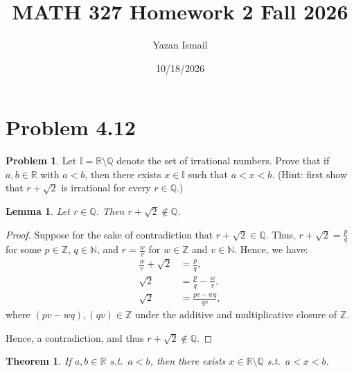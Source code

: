 \documentclass{article}
\title{MATH 327 Homework 2 Fall 2026}
\author{Yazan Ismail}
\date{10/18/2026}
\newtheorem{lemma}{Lemma}
\newtheorem{theorem}{Theorem}
\theoremstyle{definition}
\newtheorem*{problem}{Problem}
\begin{document}
\maketitle

\section{Problem 4.12}

\begin{problem}
Let $\mathbb{I} = \mathbb{R} \setminus \mathbb{Q}$ denote the set of irrational numbers. Prove that if $a, b \in \mathbb{R}$ with $a < b$, then there exists $x \in \mathbb{I}$ such that $a < x < b$. (Hint: first show that $r + \sqrt{2}$ is irrational for every $r \in \mathbb{Q}$.)
\end{problem}

\begin{lemma}\label{lem:r-sqrt2}
Let $r \in \mathbb{Q}$. Then $r + \sqrt{2} \notin \mathbb{Q}$.
\end{lemma}

\begin{proof}
Suppose for the sake of contradiction that $r + \sqrt{2} \in \mathbb{Q}$. Thus, $r + \sqrt{2} = \frac{p}{q}$ for some $p \in \mathbb{Z}$, $q \in \mathbb{N}$, and $r = \frac{w}{v}$ for $w \in \mathbb{Z}$ and $v \in \mathbb{N}$. Hence, we have:
\begin{align*}
\frac{w}{v} + \sqrt{2} &= \frac{p}{q}, \\
\sqrt{2} &= \frac{p}{q} - \frac{w}{v}, \\
\sqrt{2} &= \frac{pv - wq}{qv},
\end{align*}
where $(pv - wq), (qv) \in \mathbb{Z}$ under the additive and multiplicative closure of $\mathbb{Z}$.

Hence, a contradiction, and thus $r + \sqrt{2} \notin \mathbb{Q}$.
\end{proof}

\begin{theorem}
If $a, b \in \mathbb{R}$ s.t.\ $a < b$, then there exists $x \in \mathbb{R} \setminus \mathbb{Q}$ s.t.\ $a < x < b$.
\end{theorem}
\end{document}
